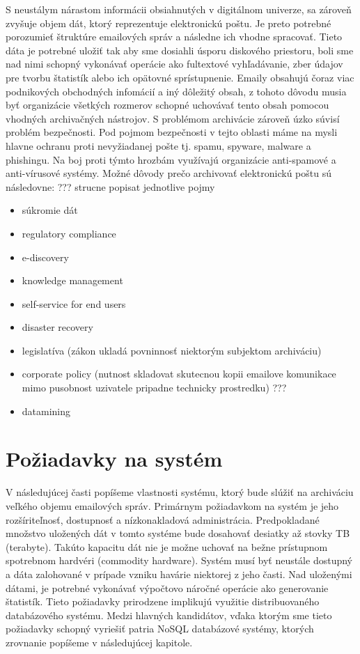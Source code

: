 \documentclass[11pt,twoside,a4paper]{book}
\begin{document}
S neustálym nárastom informácii obsiahnutých v digitálnom univerze, sa zároveň zvyšuje objem dát, ktorý reprezentuje elektronickú poštu. Je preto potrebné porozumieť štruktúre emailových správ a následne ich vhodne spracovať. Tieto dáta je potrebné uložiť tak aby sme dosiahli úsporu diskového priestoru, boli sme nad nimi schopný vykonávať operácie ako fultextové vyhľadávanie, zber údajov pre tvorbu štatistík alebo ich opätovné sprístupnenie. Emaily obsahujú čoraz viac podnikových obchodných infomácií a iný dôležitý obsah, z tohoto dôvodu musia byť organizácie všetkých rozmerov schopné uchovávať tento obsah pomocou vhodných archivačných nástrojov. S problémom archivácie zároveň úzko súvisí problém bezpečnosti. Pod pojmom bezpečnosti v tejto oblasti máme na mysli hlavne ochranu proti nevyžiadanej pošte tj. spamu, spyware, malware a phishingu. Na boj proti týmto hrozbám využívajú organizácie anti-spamové a anti-vírusové systémy. Možné dôvody prečo archivovať elektronickú poštu sú následovne:
??? strucne popisat jednotlive pojmy
\begin{itemize}
 \item 
 súkromie dát
 \item
 regulatory compliance
 \item
 e-discovery
 \item
 knowledge management
 \item 
 self-service for end users
 \item
 disaster recovery
 \item
 legislatíva (zákon ukladá povninnosť niektorým subjektom archiváciu)
 \item
 corporate policy (nutnost skladovat skutecnou kopii emailove komunikace mimo pusobnost uzivatele pripadne technicky prostredku) ???
 \item
 datamining 
\end{itemize}


\section{Požiadavky na systém}

V následujúcej časti popíšeme vlastnosti systému, ktorý bude slúžiť na archiváciu veľkého objemu emailových správ. Primárnym požiadavkom na systém je jeho rozšíriteľnosť, dostupnosť a nízkonakladová administrácia. Predpokladané množstvo uložených dát v tomto systéme bude dosahovať desiatky až stovky TB (terabyte). Takúto kapacitu dát nie je možne uchovať na bežne prístupnom spotrebnom hardvéri (commodity hardware). Systém musí byť neustále dostupný a dáta zalohované v prípade vzniku havárie niektorej z jeho časti. Nad uloženými dátami, je potrebné vykonávať výpočtovo náročné operácie ako generovanie štatistík. Tieto požiadavky prirodzene implikujú využitie distribuovaného databázového systému. Medzi hlavných kandidátov, vďaka ktorým sme tieto požiadavky schopný vyriešiť patria NoSQL databázové systémy, ktorých zrovnanie popíšeme v následujúcej kapitole.
\end{document}
